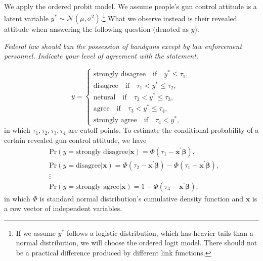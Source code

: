 \documentclass[11pt]{article}
\begin{document}
We apply the ordered probit model. We assume people's gun control attitude is a latent variable \(y^* \sim \mathcal{N}(\mu, \sigma^2)\).\footnote{If we assume \(y^*\) follows a logistic distribution, which has heavier tails than a normal distribution, we will choose the ordered logit model. There should not be a practical difference produced by different link functions.} What we observe instead is their revealed attitude when answering the following question (denoted as \(y\)).
\begin{displayquote}
\itshape
Federal law should ban the possession of handguns except by law enforcement personnel. Indicate your level of agreement with the statement.\\
\end{displayquote}
\[
    y = 
    \begin{cases}
    \text{strongly disagree} \quad \text{if} \quad y^* \leq \tau_{1},\\
    \text{disagree} \quad \text{if} \quad \tau_{1} < y^* \leq \tau_{2},\\
    \text{netural} \quad \text{if} \quad \tau_{2} < y^* \leq \tau_{3},\\
    \text{agree} \quad \text{if} \quad \tau_{3} < y^* \leq \tau_{4},\\
    \text{strongly agree} \quad \text{if} \quad \tau_{4} < y^*,
    \end{cases}
\]
in which \(\tau_{1}, \tau_{2}, \tau_{3}, \tau_{4}\) are cutoff points. To estimate the conditional probability of a certain revealed gun control attitude, we have
\begin{align*}
    &\text{Pr}(y = \text{strongly disagree}|\mathbf{x}) = \Phi(\tau_{1} - \mathbf{x^{\prime}}\boldsymbol{\beta}),\\
    &\text{Pr}(y = \text{disagree}|\mathbf{x}) = \Phi(\tau_{2} -\mathbf{x^{\prime}}\boldsymbol{\beta}) - \Phi(\tau_{1} - \mathbf{x^{\prime}}\boldsymbol{\beta}),\\
    &\vdots\\
    &\text{Pr}(y = \text{strongly agree}|\mathbf{x}) = 1 - \Phi(\tau_{4} - \mathbf{x^{\prime}}\boldsymbol{\beta}),
\end{align*}
in which \(\Phi\) is standard normal distribution's cumulative density function and \(\mathbf{x}\) is a row vector of independent variables.
\end{document}
